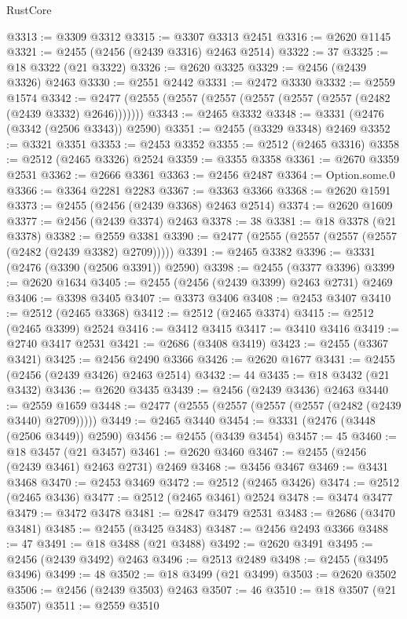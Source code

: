 \begin{lexlean}{RustCore}
\begin{coremodule}
@3313 := @3309 @3312
@3315 := @3307 @3313 @2451
@3316 := @2620 @1145
@3321 := @2455 (@2456 (@2439 @3316) @2463 @2514)
@3322 := 37
@3325 := @18 @3322 (@21 @3322)
@3326 := @2620 @3325
@3329 := @2456 (@2439 @3326) @2463
@3330 := @2551 @2442
@3331 := @2472 @3330
@3332 := @2559 @1574
@3342 := @2477 (@2555 (@2557 (@2557 (@2557 (@2557 (@2557 (@2482 (@2439 @3332) @2646)))))))
@3343 := @2465 @3332
@3348 := @3331 (@2476 (@3342 (@2506 @3343)) @2590)
@3351 := @2455 (@3329 @3348) @2469
@3352 := @3321 @3351
@3353 := @2453 @3352
@3355 := @2512 (@2465 @3316)
@3358 := @2512 (@2465 @3326) @2524
@3359 := @3355 @3358
@3361 := @2670 @3359 @2531
@3362 := @2666 @3361
@3363 := @2456 @2487
@3364 := Option.some.{0}
@3366 := @3364 @2281 @2283
@3367 := @3363 @3366
@3368 := @2620 @1591
@3373 := @2455 (@2456 (@2439 @3368) @2463 @2514)
@3374 := @2620 @1609
@3377 := @2456 (@2439 @3374) @2463
@3378 := 38
@3381 := @18 @3378 (@21 @3378)
@3382 := @2559 @3381
@3390 := @2477 (@2555 (@2557 (@2557 (@2557 (@2482 (@2439 @3382) @2709)))))
@3391 := @2465 @3382
@3396 := @3331 (@2476 (@3390 (@2506 @3391)) @2590)
@3398 := @2455 (@3377 @3396)
@3399 := @2620 @1634
@3405 := @2455 (@2456 (@2439 @3399) @2463 @2731) @2469
@3406 := @3398 @3405
@3407 := @3373 @3406
@3408 := @2453 @3407
@3410 := @2512 (@2465 @3368)
@3412 := @2512 (@2465 @3374)
@3415 := @2512 (@2465 @3399) @2524
@3416 := @3412 @3415
@3417 := @3410 @3416
@3419 := @2740 @3417 @2531
@3421 := @2686 (@3408 @3419)
@3423 := @2455 (@3367 @3421)
@3425 := @2456 @2490 @3366
@3426 := @2620 @1677
@3431 := @2455 (@2456 (@2439 @3426) @2463 @2514)
@3432 := 44
@3435 := @18 @3432 (@21 @3432)
@3436 := @2620 @3435
@3439 := @2456 (@2439 @3436) @2463
@3440 := @2559 @1659
@3448 := @2477 (@2555 (@2557 (@2557 (@2557 (@2482 (@2439 @3440) @2709)))))
@3449 := @2465 @3440
@3454 := @3331 (@2476 (@3448 (@2506 @3449)) @2590)
@3456 := @2455 (@3439 @3454)
@3457 := 45
@3460 := @18 @3457 (@21 @3457)
@3461 := @2620 @3460
@3467 := @2455 (@2456 (@2439 @3461) @2463 @2731) @2469
@3468 := @3456 @3467
@3469 := @3431 @3468
@3470 := @2453 @3469
@3472 := @2512 (@2465 @3426)
@3474 := @2512 (@2465 @3436)
@3477 := @2512 (@2465 @3461) @2524
@3478 := @3474 @3477
@3479 := @3472 @3478
@3481 := @2847 @3479 @2531
@3483 := @2686 (@3470 @3481)
@3485 := @2455 (@3425 @3483)
@3487 := @2456 @2493 @3366
@3488 := 47
@3491 := @18 @3488 (@21 @3488)
@3492 := @2620 @3491
@3495 := @2456 (@2439 @3492) @2463
@3496 := @2513 @2489
@3498 := @2455 (@3495 @3496)
@3499 := 48
@3502 := @18 @3499 (@21 @3499)
@3503 := @2620 @3502
@3506 := @2456 (@2439 @3503) @2463
@3507 := 46
@3510 := @18 @3507 (@21 @3507)
@3511 := @2559 @3510

\end{coremodule}
\end{lexlean}
